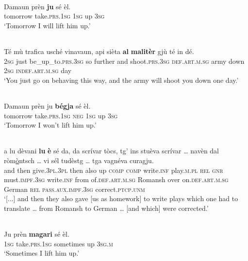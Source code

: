 \ea\label{ex:pv:1}
\\
\gll   Damaun prèn \textbf{ju} sé èl.\\
     tomorrow take.\textsc{prs.1sg} \textsc{1sg} up \textsc{3sg}\\
\glt `Tomorrow I will lift him up.'
\z

\ea\label{ex:pv:2}
\\
\gll  Té mù trafica usché vinavaun, api sièta \textbf{al} \textbf{malitèr} gjù té in dé.\\
     \textsc{2sg} just be\_up\_to.\textsc{prs.3sg} so further and shoot.\textsc{prs.3sg} \textsc{def.art.m.sg} army down \textsc{2sg} \textsc{indef.art.m.sg} day\\
\glt `You just go on behaving this way, and the army will shoot you down one day.' 
\z

\ea\label{ex:pv:3}
\\
\gll   Damaun prèn ju \textbf{bégja} sé èl.\\
     tomorrow take.\textsc{prs.1sg} \textsc{neg} \textsc{1sg} up \textsc{3sg}\\
\glt `Tomorrow I won’t lift him up.'
\z

\ea\label{ex:pv:4}
\\
	\gll    [...] a lu dèvani \textbf{lu} \textbf{è} sé da, da scrívar tòcs, tg’ ins stuèva scrívar … navèn dal ròm\underline{ò}ntsch … vi sél tudèstg … tga vagnéva curagju.\\
{} and then give.\textsc{3pl.3pl} then also up \textsc{comp} \textsc{comp} write.\textsc{inf} play.\textsc{m.pl} \textsc{rel} \textsc{gnr} must.\textsc{impf.3sg} write.\textsc{inf} {} from  of.\textsc{def.art.m.sg} Romansh {} over on.\textsc{def.art.m.sg} German {} \textsc{rel} \textsc{pass.aux.impf.3sg} correct.\textsc{ptcp.unm}\\

\glt `[...] and then they also gave [us as homework] to write plays which one had to translate … from Romansh to German … [and which] were corrected.'
\z

\ea
\label{ex:pv:5}
\\
\gll  Ju prèn \textbf{magari} sé èl.  \\
\textsc{1sg} take.\textsc{prs.1sg} sometimes up \textsc{3sg.m}\\
\glt `Sometimes I lift him up.'
\z

